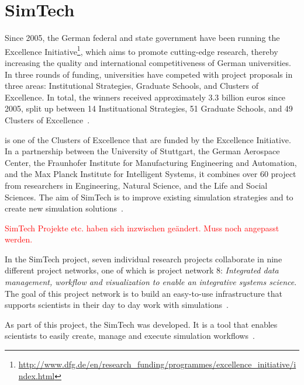 \section{SimTech}

Since 2005, the German federal and state government have been running the Excellence Initiative\footnote{\url{http://www.dfg.de/en/research_funding/programmes/excellence_initiative/index.html}}, which aims to promote cutting-edge research, thereby increasing the quality and international competitiveness of German universities.
In three rounds of funding, universities have competed with project proposals in three areas: Institutional Strategies, Graduate Schools, and Clusters of Excellence.
In total, the winners received approximately 3.3 billion euros since 2005, split up between 14 Instituational Strategies, 51 Graduate Schools, and 49 Clusters of Excellence~\autocite[pp.~16-18]{excellence:glance}.

 is one of the Clusters of Excellence that are funded by the Excellence Initiative.
In a partnership between the University of Stuttgart, the German Aerospace Center, the Fraunhofer Institute for Manufacturing Engineering and Automation, and the Max Planck Institute for Intelligent Systems, it combines over 60 project from researchers in Engineering, Natural Science, and the Life and Social Sciences.
The aim of SimTech is to improve existing simulation strategies and to create new simulation solutions~\autocite[pp.~109]{excellence:glance}.

\textcolor{red}{SimTech Projekte etc. haben sich inzwischen geändert. Muss noch angepasst werden.}

In the SimTech project, seven individual research projects collaborate in nine different project networks, one of which is project network 8: \textit{Integrated data management, workflow and visualization to enable an integrative systems science}.
The goal of this project network is to build an easy-to-use infrastructure that supports scientists in their day to day work with simulations~\autocite{simtech:projectnetwork8}.

As part of this project, the SimTech  was developed.
It is a tool that enables scientists to easily create, manage and execute simulation workflows~\autocite{workflow:simulation:flexibility}.
